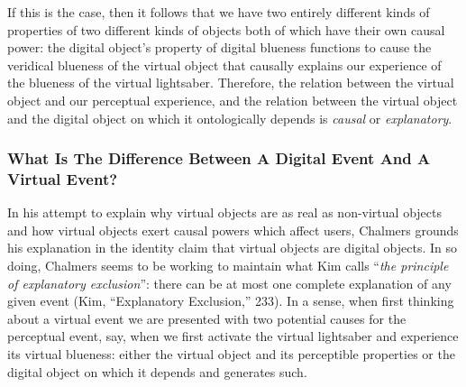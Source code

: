 \documentclass{article}
\begin{document}
If this is the case, then it follows that we have two entirely different kinds of properties of two different kinds of objects both of which have their own causal power: the digital object’s property of digital blueness functions to cause the veridical blueness of the virtual object that causally explains our experience of the blueness of the virtual lightsaber. Therefore, the relation between the virtual object and our perceptual experience, and the relation between the virtual object and the digital object on which it ontologically depends is \textit{causal} or \textit{explanatory}.

\subsubsection*{What Is The Difference Between A Digital Event And A Virtual Event?}

In his attempt to explain why virtual objects are as real as non-virtual objects and how virtual objects exert causal powers which affect users, Chalmers grounds his explanation in the identity claim that virtual objects are digital objects. In so doing, Chalmers seems to be working to maintain what Kim calls ``\textit{the principle of explanatory exclusion}'': there can be at most one complete explanation of any given event (Kim, ``Explanatory Exclusion,'' 233). In a sense, when first thinking about a virtual event we are presented with two potential causes for the perceptual event, say, when we first activate the virtual lightsaber and experience its virtual blueness: either the virtual object and its perceptible properties or the digital object on which it depends and generates such.
\end{document}
